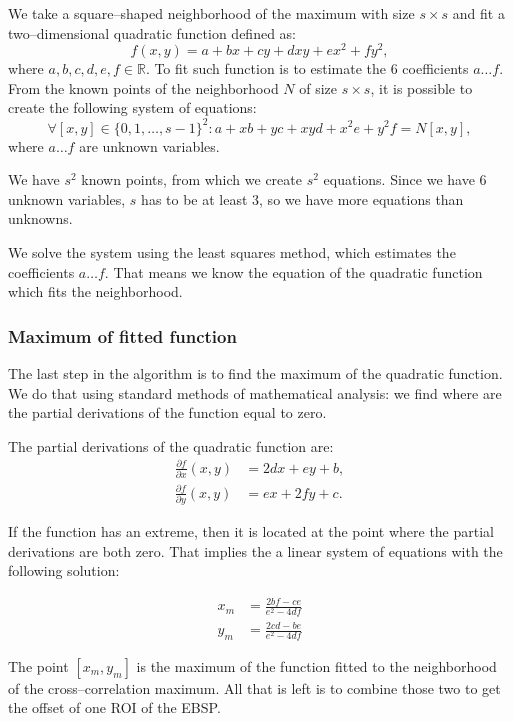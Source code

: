 We take a square--shaped neighborhood of the maximum with size $s \times s$ and fit a two--dimensional quadratic function defined as:
\[
f(x,y) = a + bx + cy + dxy + ex^2 + fy^2,
\]
where $a, b, c, d, e, f \in \mathbb{R}$. To fit such function is to estimate the 6 coefficients $a \dots f$. From the known points of the neighborhood $N$ of size $s \times s$, it is possible to create the following system of equations:
\[
\forall [x,y] \in \{0,1,\dots , s-1\}^2 : a + xb + yc + xyd + x^2e + y^2f = N[x,y],
\]
where $a \dots f$ are unknown variables.

We have $s^2$ known points, from which we create $s^2$ equations. Since we have 6 unknown variables, $s$ has to be at least 3, so we have more equations than unknowns. 

We solve the system using the least squares method, which estimates the coefficients $a \dots f$. That means we know the equation of the quadratic function which fits the neighborhood.

\subsubsection{Maximum of fitted function}

The last step in the algorithm is to find the maximum of the quadratic function. We do that using standard methods of mathematical analysis: we find where are the partial derivations of the function equal to zero.

The partial derivations of the quadratic function are:
\begin{align*}
\frac{\partial f}{\partial x}(x,y) &= 2dx + ey + b,\\
\frac{\partial f}{\partial y}(x,y) &= ex + 2fy + c.
\end{align*}

If the function has an extreme, then it is located at the point where the partial derivations are both zero. That implies the a linear system of equations with the following solution:

\begin{align*}
x_m &= \frac{2bf - ce}{e^2 - 4df}\\
y_m &= \frac{2cd - be}{e^2 - 4df}
\end{align*}

The point $[x_m, y_m]$ is the maximum of the function fitted to the neighborhood of the cross--correlation maximum. All that is left is to combine those two to get the offset of one ROI of the EBSP.

